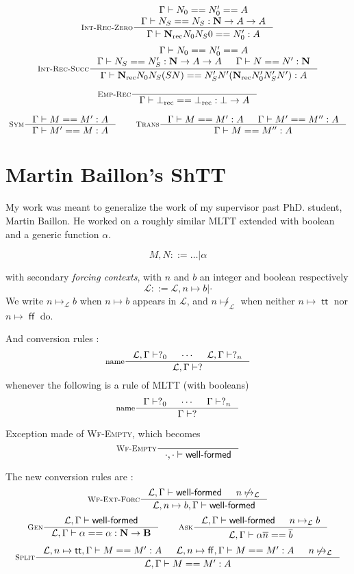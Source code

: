 \documentclass{article}
\DeclareMathOperator{\rec}{rec}
\DeclareMathOperator{\true}{\mathsf{tt}}
\DeclareMathOperator{\false}{\mathsf{ff}}
\newcommand{\ovl}{\overline}
\newcommand{\0}{\mathbf{0}}
\newcommand{\1}{\mathbf{1}}
\newcommand{\nat}{\mathbf{N}}
\newcommand{\bool}{\mathbf{B}}
\newcommand{\Wf}{\textsf{well-formed}}
\begin{document}
$$
    \inference[\textsc{Int-Rec-Zero}]{\Gamma |- N_0 == N'_0 == A\\ \Gamma |- N_S == N_S : \nat -> A  -> A}{\Gamma |- \nat_{\rec} N_0N_S0 == N'_0 : A}
$$
$$
    \inference[\textsc{Int-Rec-Succ}]{\Gamma |- N_0 == N'_0 == A\\ \Gamma |- N_S == N'_S : \nat -> A  -> A & \Gamma |- N == N' :\nat}{\Gamma |- \nat_{\rec} N_0N_S (S N) == N'_S N' (\nat_{\rec}N'_0 N'_S N') : A}
$$


$$
    \inference[\textsc{Emp-Rec}]{}{\Gamma |- \bot_{\rec} == \bot_{\rec} : \bot -> A}
$$

$$
    \inference[\textsc{Sym}]{\Gamma |- M == M' : A}{\Gamma |- M' == M : A} \qquad
    \inference[\textsc{Trans}]
    {\Gamma |- M == M' :A & \Gamma |- M' == M'' : A}{\Gamma |- M == M'' : A}
$$

\section{Martin Baillon's ShTT}
My work was meant to generalize the work of my supervisor past PhD. student, Martin Baillon. He worked on a roughly similar MLTT extended with boolean and a generic function $\alpha$.

$$ M, N ::= \dots |\alpha$$

with secondary \emph{forcing contexts}, with $n$ and $b$ an integer and boolean respectively
$$ \mathcal{L} ::= \mathcal{L}, n \mapsto b | \cdot$$
We write $n\mapsto_\mathcal{L} b$ when $n\mapsto b$ appears in $\mathcal{L}$, and $n\not\mapsto_\mathcal{L}$ when neither $n\mapsto \true$ nor $n\mapsto \false$ do.

And conversion rules :
$$
    \inference[name]{\mathcal{L},\Gamma |- ?_0 & \cdots & \mathcal{L},\Gamma |- ?_n}{\mathcal{L},\Gamma |- ?}
$$
whenever the following is a rule of MLTT (with booleans)
$$
    \inference[name]{\Gamma |- ?_0 & \cdots & \Gamma |- ?_n}{\Gamma |- ?}
$$

Exception made of \textsc{Wf-Empty}, which becomes
$$
    \inference[\textsc{Wf-Empty}]{}{\cdot,\cdot |- \Wf}
$$

The new conversion rules are :
$$
    \inference[\textsc{Wf-Ext-Forc}]{\mathcal{L},\Gamma |- \Wf & n\not\mapsto_\mathcal{L}}{\mathcal{L}, n\mapsto b, \Gamma |- \Wf}
$$
$$
    \inference[\textsc{Gen}]{\mathcal{L},\Gamma|- \Wf}{\mathcal{L},\Gamma |- \alpha == \alpha : \nat -> \bool}
    \qquad
    \inference[\textsc{Ask}]{\mathcal{L},\Gamma|- \Wf &n\mapsto_\mathcal{L} b}{\mathcal{L}, \Gamma |- \alpha \ovl n == \ovl b}
$$
$$
    \inference[\textsc{Split}]{\mathcal{L},n\mapsto \true,\Gamma |-M == M' :A & \mathcal{L}, n\mapsto\false, \Gamma |- M == M' : A & n\not\mapsto_\mathcal{L}}{\mathcal{L},\Gamma |- M == M' : A}
$$
\end{document}
